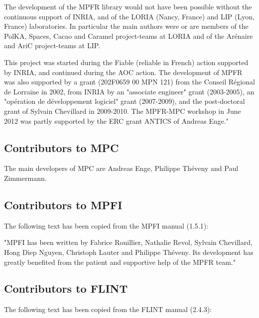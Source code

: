\vpara
The development of the MPFR library would not have been possible without
the continuous support of INRIA, and of the LORIA (Nancy, France) and LIP
(Lyon, France) laboratories. In particular the main authors were or are
members of the PolKA, Spaces, Cacao and Caramel
project-teams at LORIA and of the
Ar\'enaire and AriC project-teams at LIP.

This project was started during the Fiable (reliable in French) action
supported by INRIA, and continued during the AOC action.
The development of MPFR was also supported by a grant
(202F0659 00 MPN 121) from the Conseil R\'egional de Lorraine in 2002,
from INRIA by an "associate engineer" grant (2003-2005),
an "op\'eration de d\'eveloppement logiciel" grant (2007-2009),
and the post-doctoral grant of Sylvain Chevillard in 2009-2010.
The MPFR-MPC workshop in June 2012 was partly supported by the ERC
grant ANTICS of Andreas Enge."




\subsection{Contributors to MPC}
\label{Contributors to MPC}
The main developers of MPC are Andreas Enge, Philippe Th\'eveny and Paul Zimmermann.



\subsection{Contributors to MPFI}
\label{Contributors to MPFI}
The following text has been copied from the MPFI manual (1.5.1):

\vpara
"MPFI has been written by Fabrice Rouillier, Nathalie Revol, Sylvain Chevillard, Hong Diep
Nguyen, Christoph Lauter and Philippe Th\'eveny. Its development has greatly benefited from
the patient and supportive help of the MPFR team."




\subsection{Contributors to FLINT}
\label{Contributors to FLINT}
The following text has been copied from the FLINT manual (2.4.3):

